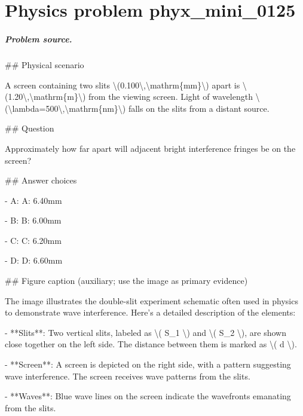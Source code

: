 
\chapter{Physics problem phyx\_mini\_0125}
\label{ch:PhyXMiniProblems_problem_phyx_mini_0125}

\paragraph{Problem source.}
\#\# Physical scenario

A screen containing two slits \textbackslash{}(0.100\textbackslash{},\textbackslash{}mathrm\{mm\}\textbackslash{}) apart is \textbackslash{}(1.20\textbackslash{},\textbackslash{}mathrm\{m\}\textbackslash{}) from the viewing screen. Light of wavelength \textbackslash{}(\textbackslash{}lambda=500\textbackslash{},\textbackslash{}mathrm\{nm\}\textbackslash{}) falls on the slits from a distant source.

\#\# Question

Approximately how far apart will adjacent bright interference fringes be on the screen?

\#\# Answer choices

- A: A: 6.40mm

- B: B: 6.00mm

- C: C: 6.20mm

- D: D: 6.60mm

\#\# Figure caption (auxiliary; use the image as primary evidence)

The image illustrates the double-slit experiment schematic often used in physics to demonstrate wave interference. Here's a detailed description of the elements:

- **Slits**: Two vertical slits, labeled as \textbackslash{}( S\_1 \textbackslash{}) and \textbackslash{}( S\_2 \textbackslash{}), are shown close together on the left side. The distance between them is marked as \textbackslash{}( d \textbackslash{}).

- **Screen**: A screen is depicted on the right side, with a pattern suggesting wave interference. The screen receives wave patterns from the slits.

- **Waves**: Blue wave lines on the screen indicate the wavefronts emanating from the slits.

